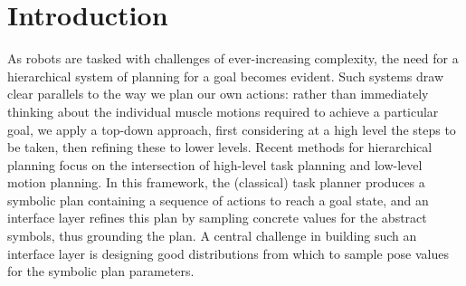 \section{Introduction}
As robots are tasked with challenges of ever-increasing complexity, the need
for a hierarchical system of planning for a goal becomes evident. Such systems
draw clear parallels to the way we plan our own actions: rather than
immediately thinking about the individual muscle motions required to achieve a particular
goal, we apply a top-down approach, first considering at a high level the
steps to be taken, then refining these to lower levels. Recent methods for
hierarchical planning focus on the intersection of high-level task planning
and low-level motion planning. In this framework, the (classical) task planner produces
a symbolic plan containing a sequence of actions to reach a goal
state, and an interface layer refines this plan by sampling concrete values for
the abstract symbols, thus grounding the plan. A central challenge in building such
an interface layer is designing good distributions from which to sample
pose values for the symbolic plan parameters.

